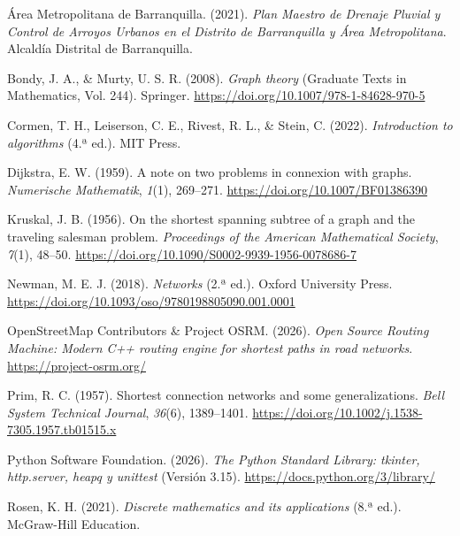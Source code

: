 \documentclass[12pt,letterpaper]{article}
\begin{document}
\begin{singlespacing}
\setlength{\parindent}{0pt}

Área Metropolitana de Barranquilla. (2021). \textit{Plan Maestro de Drenaje Pluvial y Control de Arroyos Urbanos en el Distrito de Barranquilla y Área Metropolitana}. Alcaldía Distrital de Barranquilla.

Bondy, J. A., \& Murty, U. S. R. (2008). \textit{Graph theory} (Graduate Texts in Mathematics, Vol. 244). Springer. \url{https://doi.org/10.1007/978-1-84628-970-5}

Cormen, T. H., Leiserson, C. E., Rivest, R. L., \& Stein, C. (2022). \textit{Introduction to algorithms} (4.ª ed.). MIT Press.

Dijkstra, E. W. (1959). A note on two problems in connexion with graphs. \textit{Numerische Mathematik}, \textit{1}(1), 269--271. \url{https://doi.org/10.1007/BF01386390}

Kruskal, J. B. (1956). On the shortest spanning subtree of a graph and the traveling salesman problem. \textit{Proceedings of the American Mathematical Society}, \textit{7}(1), 48--50. \url{https://doi.org/10.1090/S0002-9939-1956-0078686-7}

Newman, M. E. J. (2018). \textit{Networks} (2.ª ed.). Oxford University Press. \url{https://doi.org/10.1093/oso/9780198805090.001.0001}

OpenStreetMap Contributors \& Project OSRM. (2026). \textit{Open Source Routing Machine: Modern C++ routing engine for shortest paths in road networks}. \url{https://project-osrm.org/}

Prim, R. C. (1957). Shortest connection networks and some generalizations. \textit{Bell System Technical Journal}, \textit{36}(6), 1389--1401. \url{https://doi.org/10.1002/j.1538-7305.1957.tb01515.x}

Python Software Foundation. (2026). \textit{The Python Standard Library: tkinter, http.server, heapq y unittest} (Versión 3.15). \url{https://docs.python.org/3/library/}

Rosen, K. H. (2021). \textit{Discrete mathematics and its applications} (8.ª ed.). McGraw-Hill Education.

\end{singlespacing}
\end{document}
